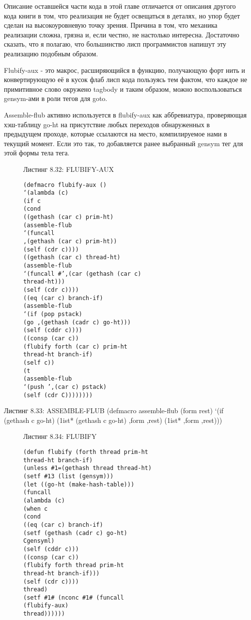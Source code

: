 {{{Описание оставшейся части кода в этой главе отличается от описания другого кода книги в том, что реализация не будет освещаться в деталях, но упор будет сделан на высокоуровневую точку зрения. Причина в том, что механика реализации сложна, грязна и, если честно, не настолько интересна. Достаточно сказать, что я полагаю, что большинство лисп программистов напишут эту реализацию подобным образом.

Flubify-aux - это макрос, расширяющийся в функцию, получающую форт нить и конвертирующую её в кусок флаб лисп кода пользуясь тем фактом, что каждое не примитивное слово окружено tagbody и таким образом, можно воспользоваться gensym-ами в роли тегов для goto.

Assemble-flub активно используется в flubify-aux как аббревиатура, проверяющая хэш-таблицу go-ht на присутствие любых переходов обнаруженных в предыдущем проходе, которые ссылаются на место, компилируемое нами в текущий момент. Если это так, то добавляется ранее выбранный gensym тег для этой формы тела тега.

\begin{figure}Листинг 8.32: FLUBIFY-AUX\label{listing_8.32}
\listbegin
\begin{verbatim}
(defmacro flubify-aux ()
‘(alambda (c)
(if c
(cond
((gethash (car c) prim-ht)
(assemble-flub
‘(funcall
,(gethash (car c) prim-ht))
(self (cdr c))))
((gethash (car c) thread-ht)
(assemble-flub
‘(funcall #’,(car (gethash (car c)
thread-ht)))
(self (cdr c))))
((eq (car c) branch-if)
(assemble-flub
‘(if (pop pstack)
(go ,(gethash (cadr c) go-ht)))
(self (cddr c))))
((consp (car c))
(flubify forth (car c) prim-ht
thread-ht branch-if)
(self c))
(t
(assemble-flub
‘(push ’,(car c) pstack)
(self (cdr C))))))))
\end{verbatim}
\listend
\end{figure}

Листинг 8.33: ASSEMBLE-FLUB
(defmacro assemble-flub (form rest)
‘(if (gethash c go-ht)
(1ist* (gethash c go-ht)
,form
,rest)
(1ist* ,form
,rest)))

\begin{figure}Листинг 8.34: FLUBIFY\label{listing_8.34}
\listbegin
\begin{verbatim}
(defun flubify (forth thread prim-ht
thread-ht branch-if)
(unless #1=(gethash thread thread-ht)
(setf #13 (list (gensym)))
(let ((go-ht (make-hash-table)))
(funcall
(alambda (c)
(when c
(cond
((eq (car c) branch-if)
(setf (gethash (cadr c) go-ht)
Cgensyml)
(self (cddr c)))
((consp (car c))
(flubify forth thread prim-ht
thread-ht branch-if)))
(self (cdr c))))
thread)
(setf #1# (nconc #1# (funcall
(flubify-aux)
thread))))))
\end{verbatim}
\listend
\end{figure}

}}}
